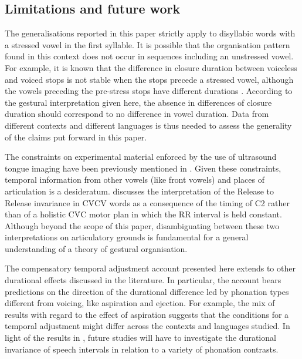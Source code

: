 \documentclass[preprint]{JASAnew}
\begin{document}
\hypertarget{limitations-and-future-work}{%
\subsection{Limitations and future
work}\label{limitations-and-future-work}}

The generalisations reported in this paper strictly apply to disyllabic
words with a stressed vowel in the first syllable. It is possible that
the organisation pattern found in this context does not occur in
sequences including an unstressed vowel. For example, it is known that
the difference in closure duration between voiceless and voiced stops is
not stable when the stops precede a stressed vowel, although the vowels
preceding the pre-stress stops have different durations
\citep{davis1989}. According to the gestural interpretation given here,
the absence in differences of closure duration should correspond to no
difference in vowel duration. Data from different contexts and different
languages is thus needed to assess the generality of the claims put
forward in this paper.

The constraints on experimental material enforced by the use of
ultrasound tongue imaging have been previously mentioned in
. Given these constraints, temporal information from
other vowels (like front vowels) and places of articulation is a
desideratum.  discusses the interpretation of the
Release to Release invariance in CV́CV words as a consequence of the
timing of C2 rather than of a holistic CV́C motor plan in which the RR
interval is held constant. Although beyond the scope of this paper,
disambiguating between these two interpretations on articulatory grounds
is fundamental for a general understanding of a theory of gestural
organisation.

The compensatory temporal adjustment account presented here extends to
other durational effects discussed in the literature. In particular, the
account bears predictions on the direction of the durational difference
led by phonation types different from voicing, like aspiration and
ejection. For example, the mix of results with regard to the effect of
aspiration \citep{durvasula2012} suggests that the conditions for a
temporal adjustment might differ across the contexts and languages
studied. In light of the results in \citet{begus2017}, future studies
will have to investigate the durational invariance of speech intervals
in relation to a variety of phonation contrasts.
\end{document}
